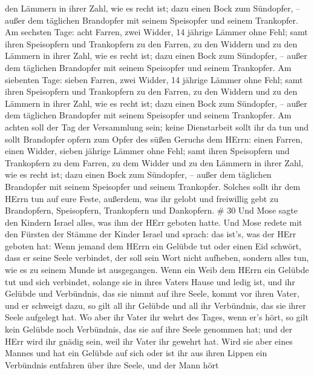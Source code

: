 den Lämmern in ihrer Zahl, wie es recht ist;  dazu einen
Bock zum Sündopfer, -- außer dem täglichen Brandopfer mit seinem
Speisopfer und seinem Trankopfer.  Am sechsten Tage: acht
Farren, zwei Widder, 14 jährige Lämmer ohne Fehl;  samt
ihren Speisopfern und Trankopfern zu den Farren, zu den Widdern und zu
den Lämmern in ihrer Zahl, wie es recht ist;  dazu einen
Bock zum Sündopfer, -- außer dem täglichen Brandopfer mit seinem
Speisopfer und seinem Trankopfer.  Am siebenten Tage:
sieben Farren, zwei Widder, 14 jährige Lämmer ohne Fehl; 
samt ihren Speisopfern und Trankopfern zu den Farren, zu den Widdern und
zu den Lämmern in ihrer Zahl, wie es recht ist;  dazu einen
Bock zum Sündopfer, -- außer dem täglichen Brandopfer mit seinem
Speisopfer und seinem Trankopfer.  Am achten soll der Tag
der Versammlung sein; keine Dienstarbeit sollt ihr da tun 
und sollt Brandopfer opfern zum Opfer des süßen Geruchs dem HErrn: einen
Farren, einen Widder, sieben jährige Lämmer ohne Fehl; 
samt ihren Speisopfern und Trankopfern zu dem Farren, zu dem Widder und
zu den Lämmern in ihrer Zahl, wie es recht ist;  dazu einen
Bock zum Sündopfer, -- außer dem täglichen Brandopfer mit seinem
Speisopfer und seinem Trankopfer.  Solches sollt ihr dem
HErrn tun auf eure Feste, außerdem, was ihr gelobt und freiwillig gebt
zu Brandopfern, Speisopfern, Trankopfern und Dankopfern. \# 30
 Und Mose sagte den Kindern Israel alles, was ihm der HErr
geboten hatte.  Und Mose redete mit den Fürsten der Stämme
der Kinder Israel und sprach: das ist's, was der HErr geboten hat:
 Wenn jemand dem HErrn ein Gelübde tut oder einen Eid
schwört, dass er seine Seele verbindet, der soll sein Wort nicht
aufheben, sondern alles tun, wie es zu seinem Munde ist ausgegangen.
 Wenn ein Weib dem HErrn ein Gelübde tut und sich verbindet,
solange sie in ihres Vaters Hause und ledig ist,  und ihr
Gelübde und Verbündnis, das sie nimmt auf ihre Seele, kommt vor ihren
Vater, und er schweigt dazu, so gilt all ihr Gelübde und all ihr
Verbündnis, das sie ihrer Seele aufgelegt hat.  Wo aber ihr
Vater ihr wehrt des Tages, wenn er's hört, so gilt kein Gelübde noch
Verbündnis, das sie auf ihre Seele genommen hat; und der HErr wird ihr
gnädig sein, weil ihr Vater ihr gewehrt hat.  Wird sie aber
eines Mannes und hat ein Gelübde auf sich oder ist ihr aus ihren Lippen
ein Verbündnis entfahren über ihre Seele,  und der Mann hört

